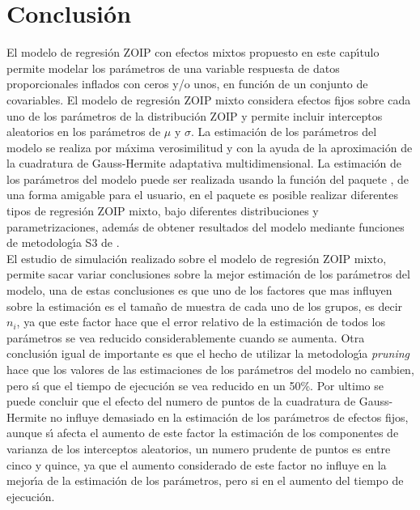 
\section{Conclusi\'{o}n}

El modelo de regresi\'{o}n ZOIP con efectos mixtos propuesto en este cap\'{\i}tulo permite modelar los par\'{a}metros de una variable respuesta de datos proporcionales inflados con ceros y/o unos, en funci\'{o}n de un conjunto de covariables. El modelo de regresi\'{o}n ZOIP mixto considera efectos fijos sobre cada uno de los par\'{a}metros de la distribuci\'{o}n ZOIP y permite incluir interceptos aleatorios en los par\'{a}metros de $\mu$ y $\sigma$. La estimaci\'{o}n de los par\'{a}metros del modelo se realiza por m\'{a}xima verosimilitud y con la ayuda de la aproximaci\'{o}n de la cuadratura de Gauss-Hermite adaptativa multidimensional. La estimaci\'{o}n de los par\'{a}metros del modelo puede ser realizada usando la funci\'{o}n  del paquete , de una forma amigable para el usuario, en el paquete es posible realizar diferentes tipos de regresi\'{o}n ZOIP mixto, bajo diferentes distribuciones y parametrizaciones, adem\'{a}s de obtener resultados del modelo mediante funciones de metodolog\'{\i}a S3 de .\\

El estudio de simulaci\'{o}n realizado sobre el modelo de regresi\'{o}n ZOIP mixto, permite sacar variar conclusiones sobre la mejor estimaci\'{o}n de los par\'{a}metros del modelo, una de estas conclusiones es que uno de los factores que mas influyen sobre la estimaci\'{o}n es el tama\~{n}o de muestra de cada uno de los grupos, es decir $n_i$, ya que este factor hace que el error relativo de la estimaci\'{o}n de todos los par\'{a}metros se vea reducido considerablemente cuando se aumenta. Otra conclusi\'{o}n igual de importante es que el hecho de utilizar la metodolog\'{\i}a \textit{pruning} hace que los valores de las estimaciones de los par\'{a}metros del modelo no cambien, pero s\'{\i} que el tiempo de ejecuci\'{o}n se vea reducido en un 50\%. Por ultimo se puede concluir que el efecto del numero de puntos de la cuadratura de Gauss-Hermite no influye demasiado en la estimaci\'{o}n de los par\'{a}metros de efectos fijos, aunque s\'{\i} afecta el aumento de este factor la estimaci\'{o}n de los componentes de varianza de los interceptos aleatorios, un numero prudente de puntos es entre cinco y quince, ya que el aumento considerado de este factor no influye en la mejor\'{\i}a de la estimaci\'{o}n de los par\'{a}metros, pero si en el aumento del tiempo de ejecuci\'{o}n.   